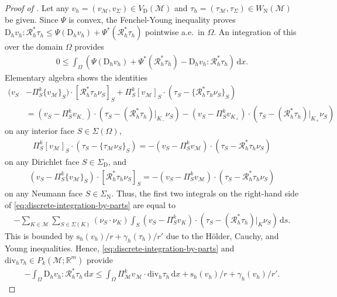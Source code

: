 \documentclass[a4paper]{amsart}
\numberwithin{equation}{section}
\newcommand{\R}{\mathbb{R}}
\renewcommand{\d}[1]{\,\mathrm{d}#1}
\renewcommand{\div}{\mathrm{div}}
\newcommand{\Mcal}{\mathcal{M}}
\newcommand{\D}{\mathrm{D}}
\newcommand{\s}{\mathrm{s}}
\theoremstyle{remark}
\begin{document}
\begin{proof}[Proof of ]
	Let any $v_h = (v_\Mcal,v_\Sigma) \in V_\mathrm{D}(\Mcal)$ and $\tau_h = (\tau_\Mcal,\tau_\Sigma) \in W_\mathrm{N}(\Mcal)$ be given.
	Since $\Psi$ is convex, the Fenchel-Young inequality \cite[p.~105]{Rockafellar1970} proves $\D_h v_h : \mathcal{R}_h^* \tau_h \leq \Psi(\D_h v_h) + \Psi^*(\mathcal{R}_h^* \tau_h)$ pointwise a.e.~in $\Omega$.
	An integration of this over the domain $\Omega$ provides
	\begin{align}\label{ineq:proof-discrete-duality-integration}
		0\leq \int_\Omega (\Psi(\D_h v_h) + \Psi^*(\mathcal{R}_h^* \tau_h) - \D_h v_h : \mathcal{R}_h^* \tau_h) \d{x}.
	\end{align}
	Elementary algebra shows the identities
	\begin{align*}
		(v_S &- \Pi_S^k\{v_\Mcal\}_S) \cdot [\mathcal{R}_h^* \tau_h \nu_S]_S + \Pi_S^k[v_\Mcal]_S \cdot (\tau_S - \{\mathcal{R}_h^* \tau_h \nu_S\}_S)\\
		& = (v_S - \Pi_S^k v_{K_-}) \cdot (\tau_S - (\mathcal{R}_h^* \tau_h)|_{K_-} \nu_S) - (v_S - \Pi_S^k v_{K_+}) \cdot (\tau_S - (\mathcal{R}_h^* \tau_h)|_{K_+} \nu_S)
	\end{align*}
	on any interior face $S \in \Sigma(\Omega)$,
	\begin{align*}
		\Pi_S^k[v_\Mcal]_S \cdot (\tau_S - \{\tau_\Mcal \nu_S\}_S) = - (v_S - \Pi_S^k v_\Mcal) \cdot (\tau_S - \mathcal{R}_h^* \tau_h \nu_S)
	\end{align*}
	on any Dirichlet face $S \in \Sigma_\mathrm{D}$, and
	\begin{align*}
		(v_S - \Pi_S^k\{v_\Mcal\}_S) \cdot [\mathcal{R}_h^* \tau_h \nu_S]_S = -(v_S - \Pi_S^k v_\Mcal) \cdot (\tau_S - \mathcal{R}_h^* \tau_h \nu_S)
	\end{align*}
	on any Neumann face $S \in \Sigma_\mathrm{N}$.
	Thus, the first two integrals on the right-hand side of \eqref{eq:discrete-integration-by-parts} are equal to
	\begin{align*}
		- \sum_{K \in \mathcal{M}} \sum_{S \in \Sigma(K)} (\nu_S \cdot \nu_K) \int_S (v_S - \Pi_S^k v_K) \cdot (\tau_S - (\mathcal{R}_h^* \tau_h)|_K \nu_S) \d{s}.
	\end{align*}
	This is bounded by $\s_h(v_h)/r + \gamma_h(\tau_h)/r'$ due to
	the H\"older, Cauchy, and Young inequalities.
	Hence, \eqref{eq:discrete-integration-by-parts} and $\div_h \tau_h \in P_k(\Mcal;\R^m)$ provide
	\begin{align*}
		- \int_\Omega \D_h v_h : \mathcal{R}_h^* \tau_h \d{x} \leq \int_\Omega \Pi_\Mcal^k v_\Mcal \cdot \div_h \tau_h \d{x} + \s_h(v_h)/r + \gamma_h(v_h)/r'.

\end{align*}
\end{proof}
\end{document}
